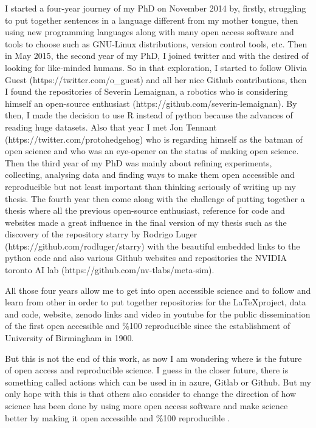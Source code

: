 \documentclass[11pt]{article}
\begin{document}
I started a four-year journey of my PhD on November 2014 
by, firstly, struggling to put together sentences in a language
different from my mother tongue, then using new programming 
languages along with many open access software and tools to choose 
such as GNU-Linux distributions, version control tools, etc. 
Then in May 2015, the second year of my PhD, I joined twitter and
with the desired of looking for like-minded humans. So in that
exploration, I started to follow 
Olivia Guest (https://twitter.com/o\_guest) and all her nice Github contributions, 
then I found the repositories of 
Severin Lemaignan, a robotics who is considering himself
an open-source enthusiast (https://github.com/severin-lemaignan). 
By then, I made the decision to use R instead of python because 
the advances of reading huge datasets. Also that year I met 
Jon Tennant (https://twitter.com/protohedgehog) 
who is regarding himself as the batman of open science
and who was an eye-opener on the status of making open 
science.
Then the third year of my PhD was mainly about refining experiments, 
collecting, analysing data and finding ways to make them open accessible 
and reproducible but not least important than thinking seriously 
of writing up my thesis. 
The fourth year then come along with the challenge of 
putting together a thesis where 
all the previous open-source enthusiast, reference for code and websites 
made a great influence in the final version of my thesis such as 
the discovery of the repository starry 
by Rodrigo Luger (https://github.com/rodluger/starry)
with the beautiful embedded links to the python code
and also various Github websites and repositories the NVIDIA toronto AI lab
(https://github.com/nv-tlabs/meta-sim).




All those four years allow me to get into open accessible science
and to follow and learn from other in order to put together 
repositories for the \LaTeX project, data and code, website, zenodo links 
and video in youtube for the public dissemination of the first
open accessible and \%100 reproducible since the establishment of 
University of Birmingham in 1900.
 
But this is not the end of this work, as now I am wondering 
where is the future of open access and reproducible science.
I guess in the closer future, there is something called actions 
which can be used in
in azure, Gitlab or Github.
But my only hope with this is that others also consider 
to change the direction of how science has been done by 
using more open access software and make science better 
by making it
open accessible and \%100 reproducible 
\cite{xochicale2019-github}.



\printbibliography
\end{document}
